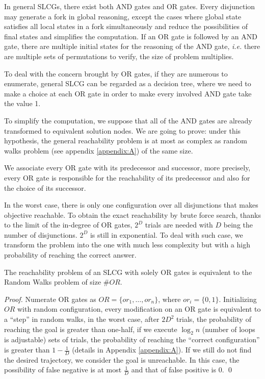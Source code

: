 \documentclass[runningheads]{llncs}
\begin{document}
In general SLCGs, there exist both AND gates and OR gates. 
Every disjunction may generate a fork in global reasoning, except the cases where global state satisfies all local states in a fork simultaneously and reduce the possibilities of final states and simplifies the computation. If an OR gate is followed by an AND gate, there are multiple initial states for the reasoning of the AND gate, \textit{i.e.} there are multiple sets of permutations to verify, the size of problem multiplies. 

To deal with the concern brought by OR gates, if they are numerous %
to enumerate, general SLCG can be regarded as a decision tree, where we need to make a choice at each OR gate in order to make every involved AND gate take the value 1. 

To simplify the computation, we suppose that all of the AND gates are already transformed to equivalent solution nodes. We are going to prove: under this hypothesis, the general reachability problem is at most as complex as random walks problem \cite{pearson1905problem} (see appendix \ref{appendix:A}) of the same size. 

We associate every OR gate with its predecessor and successor, more precisely, every OR gate is responsible for the reachability of its predecessor and also for the choice of its successor.

In the worst case, there is only one configuration over all disjunctions that makes objective reachable. 
To obtain the exact reachability by brute force search, thanks to the limit of the in-degree of OR gates, $2^D$ trials are needed with $D$ being the number of disjunctions. $2^D$ is still in exponential. 
To deal with such case, we transform the problem into the one with much less complexity but with a high probability of reaching the correct answer. 
\begin{theorem}\label{TheoEquiv}
The reachability problem of an SLCG with solely OR gates is equivalent to the Random Walks problem of size $\#OR$.
\end{theorem}
\begin{proof}
Numerate OR gates as $OR=\{or_1,\ldots, or_n\}$, where $or_i=\{0,1\}$. 
Initializing $OR$ with random configuration, every modification on an OR gate is equivalent to a ``step'' in random walks, in the worst case, after $2D^2$ trials, the probability of reaching the goal is greater than one-half, if we execute $\log_2 n$ (number of loops is adjustable) sets of trials, the probability of reaching the ``correct configuration'' is greater than $1-\frac{1}{D}$ (details in Appendix \ref{appendix:A}). 
If we still do not find the desired trajectory, we consider the goal is unreachable. 
In this case, the possibility of false negative is at most $\frac{1}{D}$ and that of false positive is $0$.
\qed\end{proof}
\end{document}
